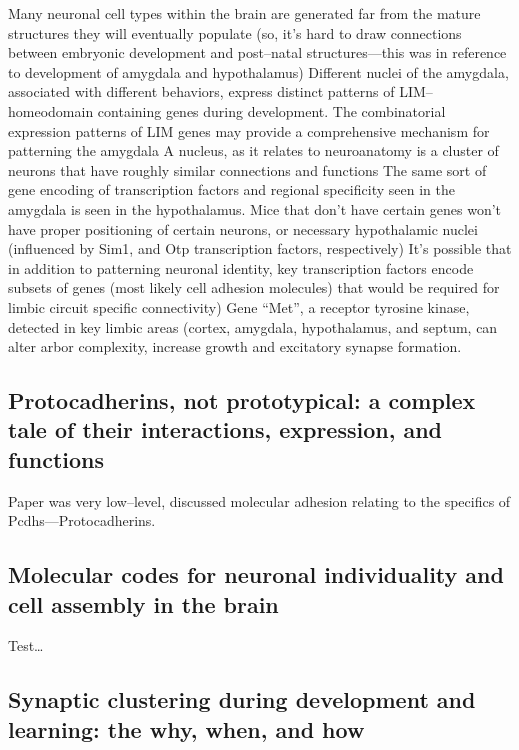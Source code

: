 \documentclass[11pt, a4paper, oneside]{article}   	%
\begin{document}
\begin{outline}
  \point Many neuronal cell types within the brain are generated far from the mature structures they will eventually populate (so, it's hard to draw connections between embryonic development and post--natal structures---this was in reference to development of amygdala and hypothalamus)
  \point Different nuclei of the amygdala, associated with different behaviors, express distinct patterns of LIM--homeodomain containing genes during development.
    \subpoint The combinatorial expression patterns of LIM genes may provide a comprehensive mechanism for patterning the amygdala
    \subpoint A nucleus, as it relates to neuroanatomy is a cluster of neurons that have roughly similar connections and functions
  \point The same sort of gene encoding of transcription factors and regional specificity seen in the amygdala is seen in the hypothalamus.
  \point Mice that don't have certain genes won't have proper positioning of certain neurons, or necessary hypothalamic nuclei (influenced by Sim1, and Otp transcription factors, respectively)
  \point It's possible that in addition to patterning neuronal identity, key transcription factors encode subsets of genes (most likely cell adhesion molecules) that would be required for limbic circuit specific connectivity)
  \point Gene ``Met'', a receptor tyrosine kinase, detected in key limbic areas (cortex, amygdala, hypothalamus, and septum, can alter arbor complexity, increase growth and excitatory synapse formation. 

\end{outline}


  


\subsection{Protocadherins, not prototypical: a complex tale of their interactions, expression, and functions}

Paper was very low--level, discussed molecular adhesion relating to the specifics of Pcdhs---Protocadherins.

\subsection{Molecular codes for neuronal individuality and cell assembly in the brain}

Test\ldots

\subsection{Synaptic clustering during development and learning: the why, when, and how}
\end{document}
